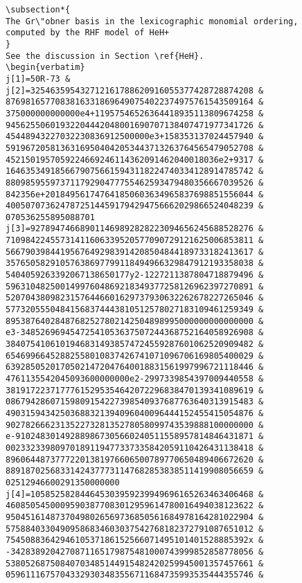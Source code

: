 \begin{verbatim}
\subsection*{
The Gr\"obner basis in the lexicographic monomial ordering,
computed by the RHF model of HeH+
} 
See the discussion in Section \ref{HeH}.
\begin{verbatim} 
j[1]=50R-73 &
j[2]=325463595432712161788620916055377428728874208 &
87698165770838163318696490754022374975761543509164 &
375000000000000e4+11957546526364418935113809674258 &
94562550601932204442048001690707138407471977341726 &
45448943227032230836912500000e3+158353137024457940 &
59196720581363169504042053443713263764565479052708 &
4521501957059224669246114362091462040018036e2+9317 &
16463534918566790756615943118224740334128914785742 &
88098595597371179290477755462593479480356667039526 &
842356e+201849561747641850603634965837698851556044 &
40050707362478725144591794294756662029866524048239 &
070536255895088701 
j[3]=927894746689011469892828223094656245688528276 &
71098422455731411606339520577090729121625006853811 &
56679039844195676492983914208504844189733182413617 &
35765058291057638697799118494966329847912193358038 &
5404059263392067138650177y2-1227211387804718879496 &
59631048250014997604869218349377258126962397270891 &
52070438098231576446601629737930632262678227265046 &
57732055504841568374443810512578027183109461259349 &
89538764028487682527802142504898995000000000000000 &
e3-34852696945472541053637507244368752164058926908 &
38407541061019468314938574724559287601062520909482 &
65469966452882558010837426741071096706169805400029 &
63928505201705021472047640018831561997996721118446 &
4761135542045093600000000e2-2997339854397009440558 &
38191722371777615295354642072296838470139341089619 &
08679428607159809154227398540937687763640313915483 &
49031594342503688321394096040096444152455415054876 &
90278266623135227328135278058099743539888100000000 &
e-910248301492889867305660240511558957814846431871 &
00233233980970189119477337335842059110426431138418 &
89606448737772201381976606500789770650489406672620 &
88918702568331424377731147682853838511419908056659 &
02512946600291350000000 
j[4]=105852582844645303959239949696165263463406468 &
46085054500095903877083012959614780016494038123622 &
95045161487370498026569736850561684978164281022904 &
57588403304909586834603037542768182372791087651012 &
7545088364294610537186152566071495101401528885392x &
-3428389204270871165179875481000743999852858778056 &
53805268750840703485144915482420259945001357457661 &
05961116757043329303483556711684735993535444355746 &

\end{verbatim}
